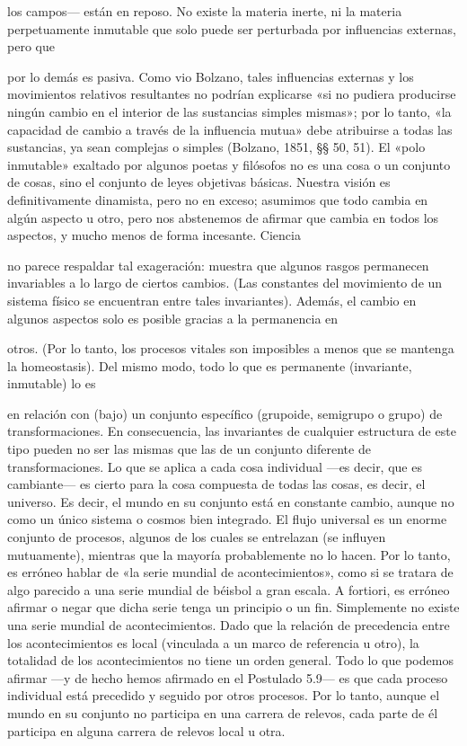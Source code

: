 \begin{justifying}
  los campos— están en reposo. No existe la materia inerte, ni la materia perpetuamente inmutable
  que solo puede ser perturbada por influencias externas, pero que

  por lo demás es pasiva. Como vio Bolzano, tales influencias externas y los
  movimientos relativos resultantes no podrían explicarse «si no pudiera
  producirse ningún cambio en el interior de las sustancias simples mismas»; por lo tanto,
  «la capacidad de cambio a través de la influencia mutua» debe atribuirse
  a todas las sustancias, ya sean complejas o simples (Bolzano, 1851, §§ 50, 51).
  El «polo inmutable» exaltado por algunos poetas y filósofos no es una
  cosa o un conjunto de cosas, sino el conjunto de leyes objetivas básicas.
  Nuestra visión es definitivamente dinamista, pero no en exceso; asumimos
  que todo cambia en algún aspecto u otro, pero nos abstenemos de
  afirmar que cambia en todos los aspectos, y mucho menos de forma incesante. Ciencia
    \noindent

    \bigskip
    no parece respaldar tal exageración: muestra que algunos rasgos
  permanecen invariables a lo largo de ciertos cambios. (Las constantes del
  movimiento de un sistema físico se encuentran entre tales invariantes). Además,
  el cambio en algunos aspectos solo es posible gracias a la permanencia en

  otros. (Por lo tanto, los procesos vitales son imposibles a menos que se mantenga la homeostasis).
  Del mismo modo, todo lo que es permanente (invariante, inmutable) lo es

  en relación con (bajo) un conjunto específico (grupoide, semigrupo o grupo) de
  transformaciones. En consecuencia, las invariantes de cualquier estructura de este tipo
  pueden no ser las mismas que las de un conjunto diferente de transformaciones.
  Lo que se aplica a cada cosa individual —es decir, que es cambiante— es
  cierto para la cosa compuesta de todas las cosas, es decir, el universo. Es decir, el
  mundo en su conjunto está en constante cambio, aunque no como un único sistema
  o cosmos bien integrado. El flujo universal es un enorme conjunto de procesos, algunos de los
  cuales se entrelazan (se influyen mutuamente), mientras que la mayoría probablemente no lo hacen.
  Por lo tanto, es erróneo hablar de «la serie mundial de acontecimientos», como si
  se tratara de algo parecido a una serie mundial de béisbol a gran escala. A fortiori, es
  erróneo afirmar o negar que dicha serie tenga un principio o un fin.
  Simplemente no existe una serie mundial de acontecimientos. Dado que la relación de precedencia
  entre los acontecimientos es local (vinculada a un marco de referencia u otro), la
  totalidad de los acontecimientos no tiene un orden general. Todo lo que podemos afirmar —y de hecho hemos
  afirmado en el Postulado 5.9— es que cada proceso individual está precedido
  y seguido por otros procesos. Por lo tanto, aunque el mundo en su conjunto
  no participa en una carrera de relevos, cada parte de él participa en alguna
  carrera de relevos local u otra.
      \noindent
      \bigskip

\end{justifying}
